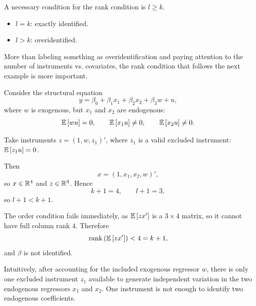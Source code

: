 \begin{remark}
	A necessary condition for the rank condition is $l\ge k$.
	\begin{itemize}
		\item $l=k$: exactly identified.
		\item $l>k$: overidentified.
	\end{itemize}
	More than labeling something as overidentification and paying attention to the number of instruments vs. covariates, the rank condition that follows the next example is more important.
\end{remark}

\begin{example}
	Consider the structural equation
	\[
		y = \beta_0 + \beta_1 x_1 + \beta_2 x_2 + \beta_3 w + u
	,\]
	where $w$ is exogenous, but $x_1$ and $x_2$ are endogenous:
	\[
		\mathbb{E}\left[wu\right] = 0, \qquad \mathbb{E}\left[x_1u\right] \ne 0, \qquad \mathbb{E}\left[x_2u\right] \ne 0
	.\]

	Take instruments $z = (1,w,z_1)'$,
	where $z_1$ is a valid excluded instrument: $\mathbb{E}\left[z_1u\right]=0$.

	Then
	\[
		x = (1,x_1,x_2,w)'
	,\]
	so $x\in\mathbb{R}^{4}$ and $z\in\mathbb{R}^{3}$. Hence
	\[
		k+1 = 4, \qquad l+1 = 3
	,\]
	so $l+1<k+1$.

	The order condition fails immediately, as $\mathbb{E}\left[zx'\right]$
	is a $3\times 4$ matrix, so it cannot have full column rank $4$. Therefore
	\[
		\operatorname{rank}\left(\mathbb{E}\left[zx'\right]\right) < 4 = k+1
	,\]
	and $\beta$ is not identified.

	Intuitively, after accounting for the included exogenous regressor $w$, there is only one excluded instrument $z_1$ available to generate independent variation in the two endogenous regressors $x_1$ and $x_2$. One instrument is not enough to identify two endogenous coefficients.
\end{example}

